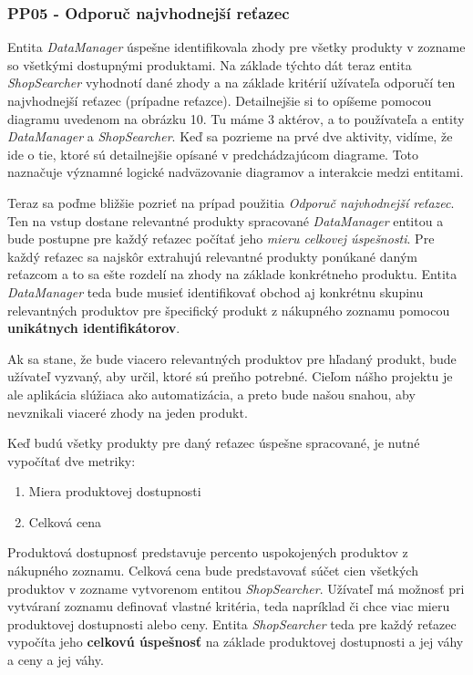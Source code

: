 \documentclass[twoside,slovak, a4paper]{article}
\begin{document}
\subsubsection*{PP05 - Odporuč najvhodnejší reťazec}

Entita \textit{DataManager} úspešne identifikovala zhody pre všetky produkty v zozname so všetkými dostupnými produktami. Na základe týchto dát teraz entita \textit{ShopSearcher} vyhodnotí dané zhody a na základe kritérií užívateľa odporučí ten najvhodnejší reťazec (prípadne reťazce). Detailnejšie si to opíšeme pomocou diagramu uvedenom na obrázku 10. Tu máme 3 aktérov, a to používateľa a entity \textit{DataManager} a \textit{ShopSearcher}. Keď sa pozrieme na prvé dve aktivity, vidíme, že ide o tie, ktoré sú detailnejšie opísané v predchádzajúcom diagrame. Toto naznačuje významné logické nadväzovanie diagramov a interakcie medzi entitami.

Teraz sa poďme bližšie pozrieť na prípad použitia \textit{Odporuč najvhodnejší reťazec}. Ten na vstup dostane relevantné produkty spracované \textit{DataManager} entitou a bude postupne pre každý reťazec počítať jeho \textit{mieru celkovej úspešnosti}. Pre každý reťazec sa najskôr extrahujú relevantné produkty ponúkané daným reťazcom a to sa ešte rozdelí na zhody na základe konkrétneho produktu. Entita \textit{DataManager} teda bude musieť identifikovať obchod aj konkrétnu skupinu relevantných produktov pre špecifický produkt z nákupného zoznamu pomocou \textbf{unikátnych identifikátorov}.

Ak sa stane, že bude viacero relevantných produktov pre hľadaný produkt, bude užívateľ vyzvaný, aby určil, ktoré sú preňho potrebné. Cieľom nášho projektu je ale aplikácia slúžiaca ako automatizácia, a preto bude našou snahou, aby nevznikali viaceré zhody na jeden produkt.

Keď budú všetky produkty pre daný reťazec úspešne spracované, je nutné vypočítať dve metriky:

\begin{enumerate}
    \item Miera produktovej dostupnosti
    \item Celková cena
\end{enumerate}

Produktová dostupnosť predstavuje percento uspokojených produktov z nákupného zoznamu. Celková cena bude predstavovať súčet cien všetkých produktov v zozname vytvorenom entitou \textit{ShopSearcher}. Užívateľ má možnosť pri vytváraní zoznamu definovať vlastné kritéria, teda napríklad či chce viac mieru produktovej dostupnosti alebo ceny. Entita \textit{ShopSearcher} teda pre každý reťazec vypočíta jeho \textbf{celkovú úspešnosť} na základe produktovej dostupnosti a jej váhy a ceny a jej váhy.
\end{document}
